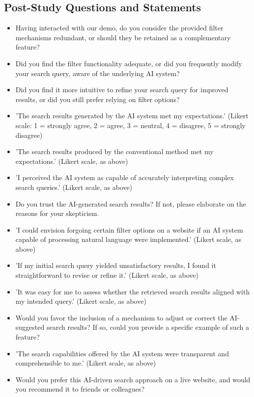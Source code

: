 \documentclass[manuscript,review]{acmart}
\begin{document}
\subsection*{Post-Study Questions and Statements}
\begin{itemize}
  \item Having interacted with our demo, do you consider the provided filter mechanisms redundant, or should they be retained as a complementary feature?
  \item Did you find the filter functionality adequate, or did you frequently modify your search query, aware of the underlying AI system?
  \item Did you find it more intuitive to refine your search query for improved results, or did you still prefer relying on filter options?
  \item 'The search results generated by the AI system met my expectations.' (Likert scale: 1 = strongly agree, 2 = agree, 3 = neutral, 4 = disagree, 5 = strongly disagree)
  \item 'The search results produced by the conventional method met my expectations.' (Likert scale, as above)
  \item 'I perceived the AI system as capable of accurately interpreting complex search queries.' (Likert scale, as above)
  \item Do you trust the AI-generated search results? If not, please elaborate on the reasons for your skepticism.
  \item 'I could envision forgoing certain filter options on a website if an AI system capable of processing natural language were implemented.' (Likert scale, as above)
  \item 'If my initial search query yielded unsatisfactory results, I found it straightforward to revise or refine it.' (Likert scale, as above)
  \item 'It was easy for me to assess whether the retrieved search results aligned with my intended query.' (Likert scale, as above)
  \item Would you favor the inclusion of a mechanism to adjust or correct the AI-suggested search results? If so, could you provide a specific example of such a feature?
  \item 'The search capabilities offered by the AI system were transparent and comprehensible to me.' (Likert scale, as above)
  \item Would you prefer this AI-driven search approach on a live website, and would you recommend it to friends or colleagues?
\end{itemize}



\end{document}

